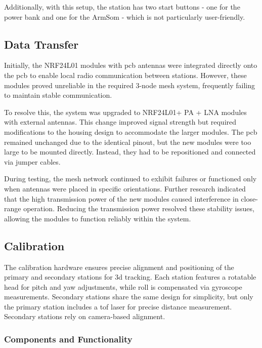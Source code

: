 Additionally, with this setup, the station has two start buttons - one for the power bank and one for the ArmSom - which is not particularly user-friendly.

\subsection{Data Transfer}

Initially, the NRF24L01 \cite{nRF24L01} modules with \acrshort{pcb} antennas were integrated directly onto the \acrshort{pcb} to enable local radio communication between stations. However, these modules proved unreliable in the required 3-node mesh system, frequently failing to maintain stable communication.

To resolve this, the system was upgraded to NRF24L01+ PA + LNA \cite{nRF24L01_plus} modules with external antennas. This change improved signal strength but required modifications to the housing design to accommodate the larger modules. The \acrshort{pcb} remained unchanged due to the identical pinout, but the new modules were too large to be mounted directly. Instead, they had to be repositioned and connected via jumper cables.

During testing, the mesh network continued to exhibit failures or functioned only when antennas were placed in specific orientations. Further research indicated that the high transmission power of the new modules caused interference in close-range operation. Reducing the transmission power resolved these stability issues, allowing the modules to function reliably within the system.

\subsection{Calibration}

The calibration hardware ensures precise alignment and positioning of the primary and secondary stations for \acrshort{3d} tracking. Each station features a rotatable head for pitch and yaw adjustments, while roll is compensated via gyroscope measurements. Secondary stations share the same design for simplicity, but only the primary station includes a \acrshort{tof} laser for precise distance measurement. Secondary stations rely on camera-based alignment.

\subsubsection*{Components and Functionality}

